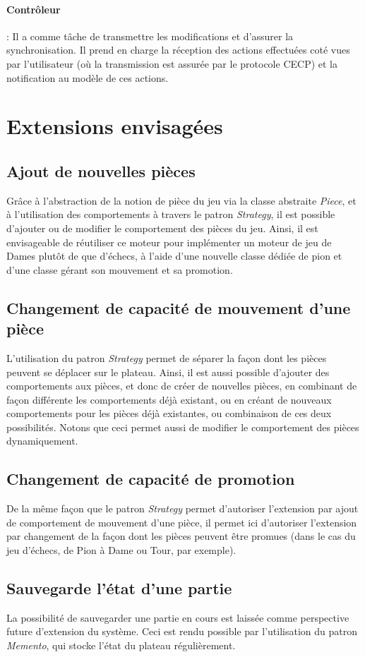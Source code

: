 \documentclass[11pt]{article}
\begin{document}
\paragraph{Contrôleur} : Il a comme tâche de transmettre les modifications et d'assurer la synchronisation. Il prend en charge la réception des actions effectuées coté vues par l'utilisateur (où la transmission est assurée par le protocole CECP) et la notification au modèle de ces actions.
\newpage
\section{Extensions envisagées}
\label{sec-4}
\subsection{Ajout de nouvelles pièces}
\label{sec-4-1}
Grâce à l'abstraction de la notion de pièce du jeu via la classe abstraite \emph{Piece}, et à l'utilisation des comportements à travers le patron \emph{Strategy}, il est possible d'ajouter ou de modifier le comportement des pièces du jeu. Ainsi, il est envisageable de réutiliser ce moteur pour implémenter un moteur de jeu de Dames plutôt de que d'échecs, à l'aide d'une nouvelle classe dédiée de pion et d'une classe gérant son mouvement et sa promotion.
\subsection{Changement de capacité de mouvement d'une pièce}
\label{sec-4-2}
L'utilisation du patron \emph{Strategy} permet de séparer la façon dont les pièces peuvent se déplacer sur le plateau. Ainsi, il est aussi possible d'ajouter des comportements aux pièces, et donc de créer de nouvelles pièces, en combinant de façon différente les comportements déjà existant, ou en créant de nouveaux comportements pour les pièces déjà existantes, ou combinaison de ces deux possibilités. Notons que ceci permet aussi de modifier le comportement des pièces dynamiquement.
\subsection{Changement de capacité de promotion}
\label{sec-4-3}
De la même façon que le patron \emph{Strategy} permet d'autoriser l'extension par ajout de comportement de mouvement d'une pièce, il permet ici d'autoriser l'extension par changement de la façon dont les pièces peuvent être promues (dans le cas du jeu d'échecs, de Pion à Dame ou Tour, par exemple).
\subsection{Sauvegarde l'état d'une partie}
\label{sec-4-4}
La possibilité de sauvegarder une partie en cours est laissée comme perspective future d'extension du système. Ceci est rendu possible par l'utilisation du patron \emph{Memento}, qui stocke l'état du plateau régulièrement.
\end{document}

